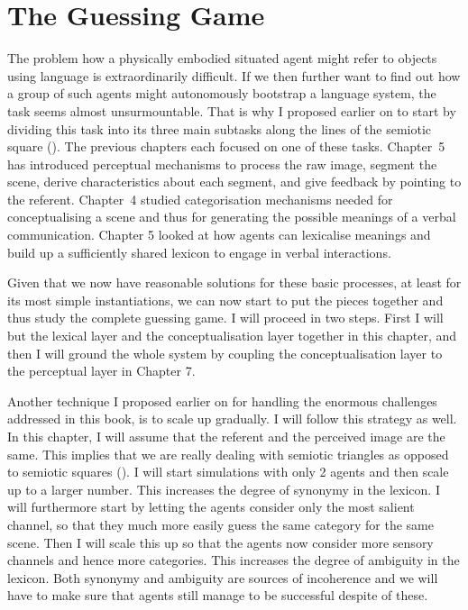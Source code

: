 \chapter{The Guessing Game}

The problem how a physically embodied situated agent
might refer to objects using language is extraordinarily 
difficult. If we then further want to find out how 
a group of such agents might autonomously bootstrap
a language system, the task seems almost unsurmountable. 
That is why I proposed earlier on to start by dividing
this task into its three main subtasks along the lines
of the semiotic square ().
The previous chapters each focused on one of these tasks. 
Chapter~5 has introduced 
perceptual mechanisms to process the raw image, segment
the scene, derive characteristics about each 
segment, and give feedback by pointing to the referent. 
Chapter~4 studied categorisation mechanisms
needed for conceptualising a scene and thus for 
generating the possible meanings of a verbal
communication. Chapter 5 looked at how agents can 
lexicalise meanings and build up a sufficiently shared
lexicon to engage in verbal interactions. 

Given that we now have reasonable solutions for these
basic processes, at least for its most simple instantiations, 
we can now start to put the pieces together and thus
study the complete guessing game. I will 
proceed in two steps. First I will but the lexical 
layer and the conceptualisation layer together in 
this chapter, and then I will ground the whole system 
by coupling the conceptualisation layer to the 
perceptual layer in Chapter 7. 

Another technique I proposed earlier on 
for handling the enormous challenges addressed in 
this book, is to scale up 
gradually. I will follow this strategy as well. In this
chapter, I will assume that the referent and the 
perceived image are the same. This implies that we 
are really dealing with semiotic triangles as 
opposed to semiotic squares (). 
I will start simulations with only 2 agents and then 
scale up to a larger number. This increases the degree
of synonymy in the lexicon. I will furthermore
start by letting the agents 
consider only the most salient channel, so that 
they much more easily guess the same category for the 
same scene. Then I will scale this up so that 
the agents now consider more sensory channels and hence
more categories. This increases the degree of 
ambiguity in the lexicon. Both synonymy and ambiguity 
are sources of incoherence and we will have to make
sure that agents still manage to be successful 
despite of these. 

